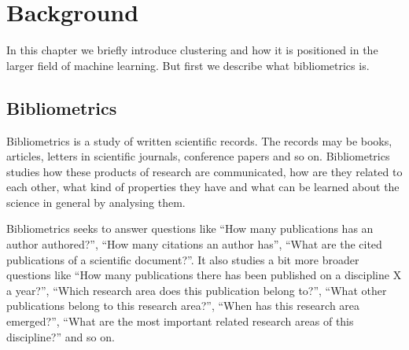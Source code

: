 \chapter{Background}
\label{chapter:background}

% 


In this chapter we briefly introduce clustering and how it is 
positioned in the larger field of machine learning. But first we
describe what bibliometrics is.

\section{Bibliometrics}
\label{sec:bibliometrics}
Bibliometrics is a study of written scientific records. The 
records may be books, articles, letters in scientific journals, 
conference papers and so on. Bibliometrics studies how these 
products of research are communicated, how are they related to 
each other, what kind of properties they have and what can be 
learned about the science in general by analysing them.

Bibliometrics seeks to answer questions like ``How many 
publications has an author authored?'', ``How many citations an 
author has'', ``What are the 
cited publications of a scientific document?''. It also studies
a bit more broader questions like ``How many publications there 
has been published on a discipline X a year?'', ``Which research area
does this publication belong to?'', ``What other publications 
belong to this research area?'', ``When has this research area
emerged?'', ``What are the most important related research areas
of this discipline?'' and so on.

